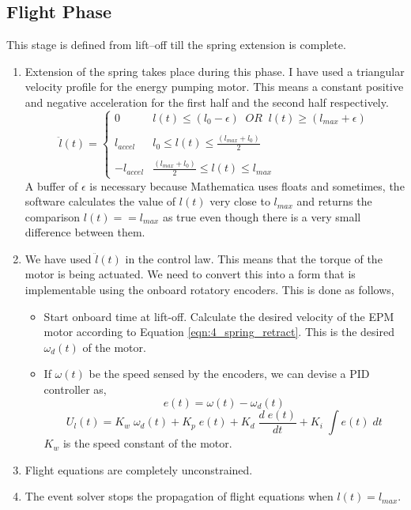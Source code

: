 \subsection*{Flight Phase}
This stage is defined from lift--off till the spring extension is complete.
\begin{enumerate}
  \item
  Extension of the spring takes place during this phase. I have used a triangular velocity profile for
  the energy pumping motor. This means a constant positive and negative acceleration for the first half and the second half respectively.
  \begin{equation}
  \ddot{l}(t) = \left\{\begin{array}{ll}
			0 & l(t) \leq (l_0 - \epsilon)\;\;OR\;\;l(t) \geq (l_{max} + \epsilon)\\
			&\\
			l_{accel} & l_0 \leq l(t) \leq \frac{(l_{max} + l_0)}{2}\\
			&\\
			-l_{accel} & \frac{(l_{max} + l_0)}{2} \leq l(t) \leq l_{max}
                      \end{array} \right.
  \label{eqn:4_spring_retract}
  \end{equation}
  A buffer of $\epsilon$ is necessary because Mathematica uses floats and sometimes, the software calculates the value of $l(t)$ very close to $l_{max}$ and returns the comparison $l(t) == l_{max}$ as true even though there is a very small difference between them.
  \item
  We have used $\ddot{l}(t)$ in the control law. This means that the torque of the motor is being actuated. We need to convert this into a form that is implementable using the onboard rotatory encoders. This is done as follows,
  \begin{itemize}
    \item
    Start onboard time at lift-off. Calculate the desired velocity of the EPM motor according to Equation \ref{eqn:4_spring_retract}. This is the desired $\omega_d(t)$ of the motor. 
    \item 
    If $\omega(t)$ be the speed sensed by the encoders, we can devise a PID controller as,
    \begin{equation}
    e(t) = \omega(t) - \omega_d(t)
    \end{equation}
    \begin{equation}
    U_{l}(t) = K_w\;\omega_d(t) + K_p\;e(t) + K_d\;\frac{d\;e(t)}{dt} + K_i\;\int e(t)\;dt
    \label{eqn:4_l_controller}
    \end{equation}
    $K_w$ is the speed constant of the motor.
  \end{itemize}
  \item
  Flight equations are completely unconstrained.
  \item
  The event solver stops the propagation of flight equations when $l(t) = l_{max}$.
\end{enumerate}

